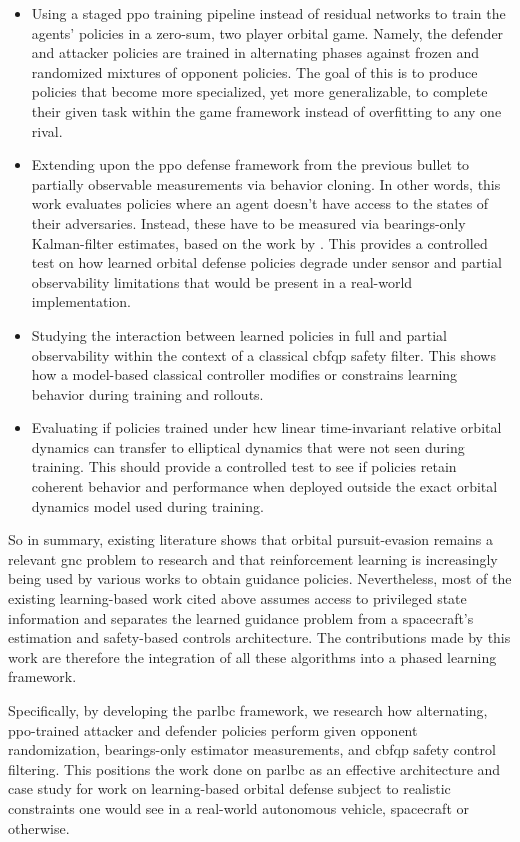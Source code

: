 \begin{itemize}
    \item Using a staged \acs{ppo} training pipeline instead of residual networks to train the agents' policies in a zero-sum, two player orbital game. Namely, the defender and attacker policies are trained in alternating phases against frozen and randomized mixtures of opponent policies. The goal of this is to produce policies that become more specialized, yet more generalizable, to complete their given task within the game framework instead of overfitting to any one rival. 

    \item Extending upon the \acs{ppo} defense framework from the previous bullet to partially observable measurements via behavior cloning. In other words, this work evaluates policies where an agent doesn't have access to the states of their adversaries. Instead, these have to be measured via bearings-only Kalman-filter estimates, based on the work by \cite{aidala1979kalman}. This provides a controlled test on how learned orbital defense policies degrade under sensor and partial observability limitations that would be present in a real-world implementation.
    \item Studying the interaction between learned policies in full and partial observability within the context of a classical \acs{cbfqp} safety filter. This shows how a model-based classical controller modifies or constrains learning behavior during training and rollouts.
    \item Evaluating if policies trained under \acs{hcw} linear time-invariant relative orbital dynamics can transfer to elliptical dynamics that were not seen during training. This should provide a controlled test to see if policies retain coherent behavior and performance when deployed outside the exact orbital dynamics model used during training.
\end{itemize}

So in summary, existing literature shows that orbital pursuit-evasion remains a relevant \acs{gnc} problem to research and that reinforcement learning is increasingly being used by various works to obtain guidance policies. Nevertheless, most of the existing learning-based work cited above assumes access to privileged state information and separates the learned guidance problem from a spacecraft's estimation and safety-based controls architecture. The contributions made by this work are therefore the integration of all these algorithms into a phased learning framework.

Specifically, by developing the \acs{parlbc} framework, we research how alternating, \acs{ppo}-trained attacker and defender policies perform given opponent randomization, bearings-only estimator measurements, and \acs{cbfqp} safety control filtering. This positions the work done on \acs{parlbc} as an effective architecture and case study for work on learning-based orbital defense subject to realistic constraints one would see in a real-world autonomous vehicle, spacecraft or otherwise.
